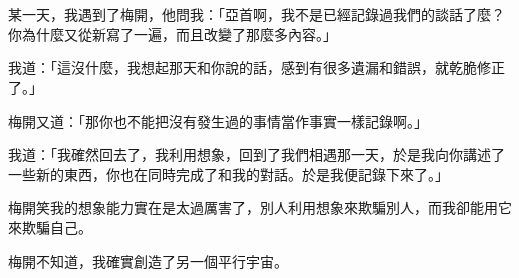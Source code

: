 \chapter*{}
某一天，我遇到了梅開，他問我：「亞首啊，我不是已經記錄過我們的談話了麼？你為什麼又從新寫了一遍，而且改變了那麼多內容。」

我道：「這沒什麼，我想起那天和你說的話，感到有很多遺漏和錯誤，就乾脆修正了。」

梅開又道：「那你也不能把沒有發生過的事情當作事實一樣記錄啊。」

我道：「我確然回去了，我利用想象，回到了我們相遇那一天，於是我向你講述了一些新的東西，你也在同時完成了和我的對話。於是我便記錄下來了。」

梅開笑我的想象能力實在是太過厲害了，別人利用想象來欺騙別人，而我卻能用它來欺騙自己。

梅開不知道，我確實創造了另一個平行宇宙。
